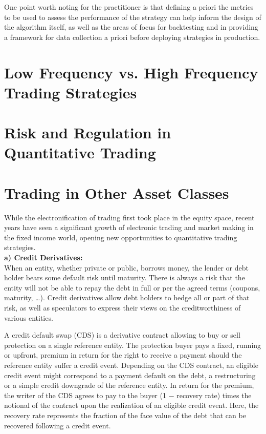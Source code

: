 One point worth noting for the practitioner is that defining a priori the metrics to be used to assess the performance of the strategy can help inform the design of the algorithm itself, as well as the areas of focus for backtesting and in providing a framework for data collection a priori before deploying strategies in production. 



\section{Low Frequency vs. High Frequency Trading Strategies}
\section{Risk and Regulation in Quantitative Trading}



\section{Trading in Other Asset Classes}

While the electronification of trading first took place in the equity space, recent years have seen a significant growth of electronic trading and market making in the fixed income world, opening new opportunities to quantitative trading strategies. \\

\noindent\textbf{a) Credit Derivatives:} \\

When an entity, whether private or public, borrows money, the lender or debt holder bears some default risk until maturity. There is always a risk that the entity will not be able to repay the debt in full or per the agreed terms (coupons, maturity, \dots). Credit derivatives allow debt holders to hedge all or part of that risk, as well as speculators to express their views on the creditworthiness of various entities. 


A credit default swap (CDS) is a derivative contract allowing to buy or sell protection on a single reference entity. The protection buyer pays a fixed, running or upfront, premium in return for the right to receive a payment should the reference entity suffer a credit event. Depending on the CDS contract, an eligible credit event might correspond to a payment default on the debt, a restructuring or a simple credit downgrade of the reference entity. In return for the premium, the writer of the CDS agrees to pay to the buyer (1 $-$ recovery rate) times the notional of the contract upon the realization of an eligible credit event. Here, the recovery rate represents the fraction of the face value of the debt that can be recovered following a credit event.



